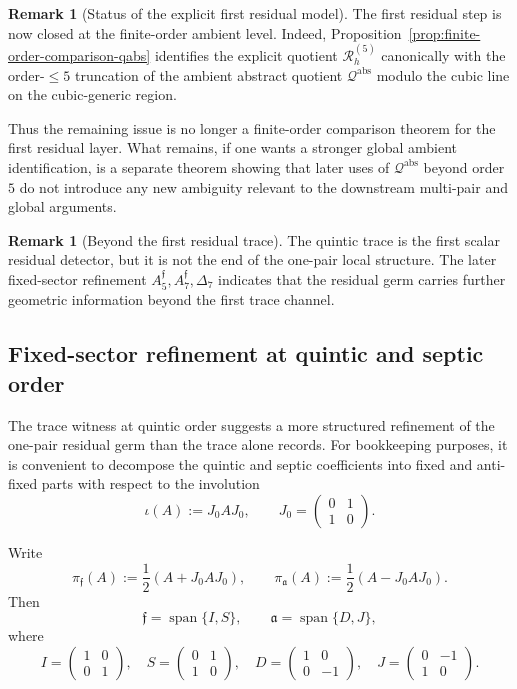 \documentclass[11pt,a4paper]{amsart}
\theoremstyle{plain}
\theoremstyle{definition}
\newtheorem{remark}[theorem]{Remark}
\newcommand{\Qabs}{\mathcal Q^{\mathrm{abs}}}
\begin{document}
\begin{remark}[Status of the explicit first residual model]
\label{rem:status-explicit-first-residual-model}
The first residual step is now closed at the finite-order ambient level.
Indeed, Proposition~\ref{prop:finite-order-comparison-qabs} identifies the
explicit quotient $\mathcal R_h^{(5)}$ canonically with the order-$\le 5$
truncation of the ambient abstract quotient $\Qabs$ modulo the cubic line on
the cubic-generic region.

Thus the remaining issue is no longer a finite-order comparison theorem for
the first residual layer. What remains, if one wants a stronger global ambient identification, is a
separate theorem showing that later uses of $\Qabs$ beyond order $5$ do not
introduce any new ambiguity relevant to the downstream multi-pair and global
arguments.
\end{remark}

\begin{remark}[Beyond the first residual trace]
\label{rem:beyond-first-residual-trace}
The quintic trace is the first scalar residual detector, but it is not the end
of the one-pair local structure. The later fixed-sector refinement
$
A_5^{\mathfrak f},A_7^{\mathfrak f},\Delta_7
$
indicates that the residual germ carries further geometric information beyond
the first trace channel.
\end{remark}

\subsection{Fixed-sector refinement at quintic and septic order}

The trace witness at quintic order suggests a more structured refinement of the
one-pair residual germ than the trace alone records. For bookkeeping purposes,
it is convenient to decompose the quintic and septic coefficients into fixed and
anti-fixed parts with respect to the involution
\[
\iota(A):=J_0AJ_0,
\qquad
J_0=
\begin{pmatrix}
0&1\\
1&0
\end{pmatrix}.
\]

Write
\[
\pi_{\mathfrak f}(A):=\frac12(A+J_0AJ_0),
\qquad
\pi_{\mathfrak a}(A):=\frac12(A-J_0AJ_0).
\]
Then
\[
\mathfrak f=\operatorname{span}\{I,S\},
\qquad
\mathfrak a=\operatorname{span}\{D,J\},
\]
where
\[
I=
\begin{pmatrix}
1&0\\0&1
\end{pmatrix},
\quad
S=
\begin{pmatrix}
0&1\\1&0
\end{pmatrix},
\quad
D=
\begin{pmatrix}
1&0\\0&-1
\end{pmatrix},
\quad
J=
\begin{pmatrix}
0&-1\\1&0
\end{pmatrix}.
\]
\end{document}
